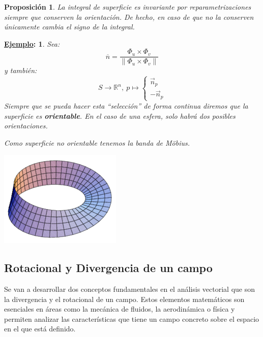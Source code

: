 \documentclass[10pt,a4paper,openright]{book}
\theoremstyle{break}
\newtheorem*{prop}{Proposición}
\newtheorem*{ej}{\underline{Ejemplo}:}
\begin{document}
\begin{prop}
La integral de superficie es invariante por reparametrizaciones siempre que conserven la orientación. De hecho, en caso de que no la conserven únicamente cambia el signo de la integral.
\end{prop}

\begin{ej}
Sea: 
$$\overline{n} = \frac{\Phi_u \times \Phi_v}{\lVert \Phi_u \times \Phi_v \rVert}$$
y también: 
$$S \rightarrow \mathbb{R}^n,\ p \mapsto \begin{cases}
    \vec{n}_p\\
    -\vec{n}_p
\end{cases} $$
Siempre que se pueda hacer esta ``selección'' de forma continua diremos que la superficie es \textbf{orientable}. En el caso de una esfera, solo habrá dos posibles orientaciones.

Como superficie no orientable tenemos la banda de Möbius.
\begin{center}
    \includegraphics[scale=0.3]{mobius} 
\end{center}
\end{ej}

\subsection{Rotacional y Divergencia de un campo}
Se van a desarrollar dos conceptos fundamentales en el análisis vectorial que son la divergencia y el rotacional de un campo. Estos elementos matemáticos son esenciales en áreas como la mecánica de fluidos, la aerodinámica o física y permiten analizar las características que tiene un campo concreto sobre el espacio en el que está definido.
\end{document}
